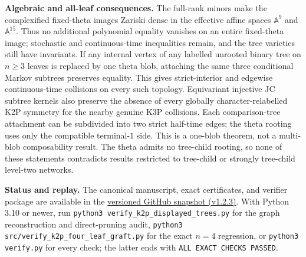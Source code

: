 \documentclass[10pt]{article}
\begin{document}
\textbf{Algebraic and all-leaf consequences.} The full-rank minors make the complexified fixed-theta images Zariski dense in the effective affine spaces $\mathbb A^9$ and $\mathbb A^{15}$. Thus no additional polynomial equality vanishes on an entire fixed-theta image; stochastic and continuous-time inequalities remain, and the tree varieties still have invariants. If any internal vertex of any labelled unrooted binary tree on $n\ge3$ leaves is replaced by one theta blob, attaching the same three conditional Markov subtrees preserves equality. This gives strict-interior and edgewise continuous-time collisions on every such topology. Equivariant injective JC subtree kernels also preserve the absence of every globally character-relabelled K2P symmetry for the nearby genuine K3P collisions. Each comparison-tree attachment can be subdivided into two strict half-time edges; the theta rooting uses only the compatible terminal-$1$ side. This is a one-blob theorem, not a multi-blob composability result. The theta admits no tree-child rooting, so none of these statements contradicts results restricted to tree-child or strongly tree-child level-two networks.

\textbf{Status and replay.} The canonical manuscript, exact certificates, and verifier package are available in the \href{https://github.com/AlecKriebel/Math/tree/k2p-k3p-theta-v1.2.3/k2p_k3p_theta_trinet_collision/k2p_k3p_theta_clarified}{versioned GitHub snapshot (v1.2.3)}. With Python 3.10 or newer, run \texttt{python3 verify\_k2p\_displayed\_trees.py} for the graph reconstruction and direct-pruning audit, \texttt{python3 src/verify\_k2p\_four\_leaf\_graft.py} for the exact $n=4$ regression, or \texttt{python3 verify.py} for every check; the latter ends with \texttt{ALL EXACT CHECKS PASSED}.
\end{document}
